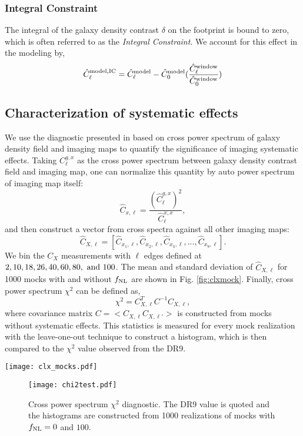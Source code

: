 \subsubsection{Integral Constraint}
The integral of the galaxy density contrast $\delta$ on the footprint is bound to zero, which is often referred to as the \textit{Integral Constraint}. We account for this effect in the modeling by,
\begin{equation}
     \hat{C}^{\rm model, IC}_{\ell} = \hat{C}^{\rm model}_{\ell} - \hat{C}^{\rm model}_{0} (\frac{\hat{C}^{\rm window}_{\ell}}{\hat{C}^{\rm window}_{0}})
\end{equation}



\subsection{Characterization of systematic effects}
\label{ssec:characterization}
We use the diagnostic presented in  based on cross power spectrum of galaxy density field and imaging maps to quantify the significance of imaging systematic effects. Taking $C^{g,x}_{\ell}$ as the cross power spectrum between galaxy density contrast field and imaging map, one can normalize this quantity by auto power spectrum of imaging map itself:
\begin{equation}
\hat{C}_{x, \ell} = \frac{(\hat{C}^{g,x}_{\ell})^{2}}{\hat{C}^{x,x}_{\ell}},
\end{equation}
and then construct a vector from cross spectra against all other imaging maps:
\begin{equation}
\hat{C}_{X, \ell} = [\hat{C}_{x_{1}, \ell}, \hat{C}_{x_{2}, \ell}, \hat{C}_{x_{3}, \ell}, ..., \hat{C}_{x_{9}, \ell}].
\end{equation}
We bin the $C_{X}$ measurements with $\ell$ edges defined at $2,  10,  18,  26,  40,  60,  80,~{\rm and}~100$. The mean and standard deviation of $\hat{C}_{X, \ell}$ for 1000 mocks with and without $f_{\rm NL}$ are shown in Fig. \ref{fig:clxmock}.  Finally, cross power spectrum $\chi^{2}$ can be defined as,
\begin{equation}
\chi^{2} = C^{T}_{X, \ell} C^{-1} C_{X, \ell},
\end{equation}
where covariance matrix $C = < C_{X, \ell} C_{X, \ell'} >$ is constructed from mocks without systematic effects. This statistics is measured for every mock realization with the leave-one-out technique to construct a histogram, which is then compared to the $\chi^{2}$ value observed from the DR9. 

\begin{figure*}
\centering
\texttt{[image: clx\_mocks.pdf]}
\caption{Normalized cross power spectrum of mocks. Top: mean cross spectrum. Bottom: standard deviation.}\label{fig:clxmock}
\end{figure*}

\begin{figure}
\centering
\texttt{[image: chi2test.pdf]}
\caption{Cross power spectrum $\chi^{2}$ diagnostic. The DR9 value is quoted and the histograms are constructed from 1000 realizations of mocks with $f_{\rm NL}=0$ and $100$.}
\end{figure}


